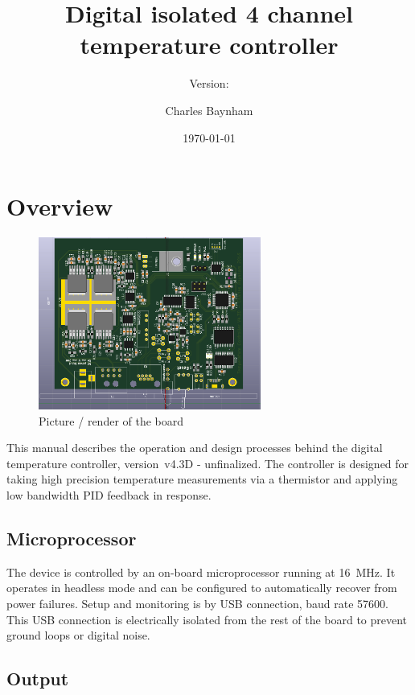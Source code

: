 \documentclass[11pt]{report}
\title{Digital isolated 4 channel temperature controller}
\subtitle{Version: \tempCtrlVer}
\author{Charles Baynham}
\date{\today}                                           %
\newcommand{\tempCtrlVer}{v4.3D - unfinalized}
\begin{document}
\maketitle

\tableofcontents
\clearpage

\chapter{Overview} %
\label{sec:overview}

\begin{figure}[h]
	\centering
	\includegraphics[width=0.65\textwidth]{BoardRender}
	\caption{Picture / render of the board}
	\label{fig:wholeboard}
\end{figure}

This manual describes the operation and design processes behind the  digital temperature controller, version~\tempCtrlVer. The controller is designed for taking high precision temperature measurements via a thermistor and applying low bandwidth PID feedback in response.

\section{Microprocessor}

The device is controlled by an on-board microprocessor running at \SI{16}{MHz}. It operates in headless mode and can be configured to automatically recover from power failures. Setup and monitoring is by USB connection, baud rate 57600. This USB connection is electrically isolated from the rest of the board to prevent ground loops or digital noise. 

\section{Output}
\end{document}
